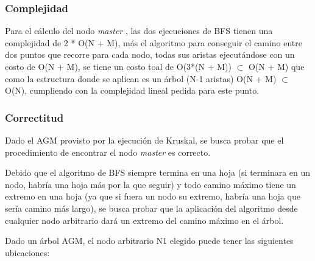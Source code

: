 \documentclass[a4paper, 10pt, twoside]{article}
\begin{document}
\subsubsection{Complejidad}

Para el cálculo del nodo \textit{master} , las dos ejecuciones de BFS tienen una complejidad de 2 * O(N + M), más el algoritmo para conseguir el camino entre dos puntos que recorre para cada nodo, todas sus aristas ejecutándose con un costo de O(N + M), se tiene un costo toal de O(3*(N + M)) $\subset$ O(N + M) que como la estructura donde se aplican es un árbol (N-1 aristas) O(N + M) $\subset$ O(N), cumpliendo con la complejidad lineal pedida para este punto.

\subsubsection{Correctitud}

Dado el AGM provisto por la ejecución de Kruskal, se busca probar que el procedimiento de encontrar el nodo \textit{master} es correcto.

Debido que el algoritmo de BFS siempre termina en una hoja (si terminara en un nodo, habría una hoja más por la que seguir) y todo camino máximo tiene un extremo en una hoja (ya que si fuera un nodo su extremo, habría una hoja que sería camino más largo), se busca probar que la aplicación del algoritmo desde cualquier nodo arbitrario dará un extremo del camino máximo en el árbol.

Dado un árbol AGM, el nodo arbitrario N1 elegido puede tener las siguientes ubicaciones:
\end{document}
